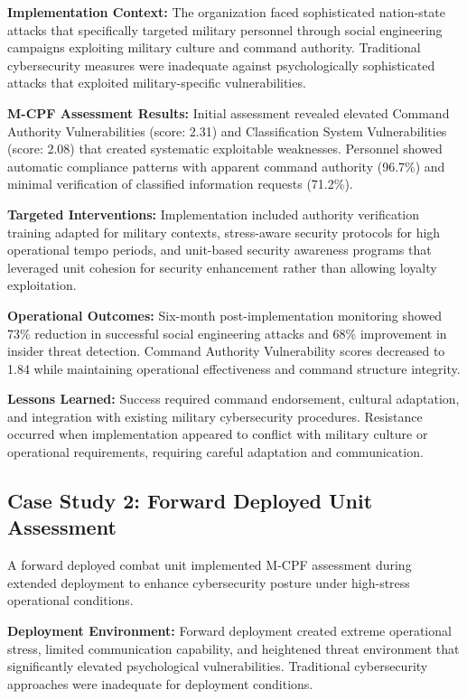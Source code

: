 \documentclass[10pt, twocolumn]{article}
\begin{document}
\textbf{Implementation Context:} The organization faced sophisticated nation-state attacks that specifically targeted military personnel through social engineering campaigns exploiting military culture and command authority. Traditional cybersecurity measures were inadequate against psychologically sophisticated attacks that exploited military-specific vulnerabilities.

\textbf{M-CPF Assessment Results:} Initial assessment revealed elevated Command Authority Vulnerabilities (score: 2.31) and Classification System Vulnerabilities (score: 2.08) that created systematic exploitable weaknesses. Personnel showed automatic compliance patterns with apparent command authority (96.7\%) and minimal verification of classified information requests (71.2\%).

\textbf{Targeted Interventions:} Implementation included authority verification training adapted for military contexts, stress-aware security protocols for high operational tempo periods, and unit-based security awareness programs that leveraged unit cohesion for security enhancement rather than allowing loyalty exploitation.

\textbf{Operational Outcomes:} Six-month post-implementation monitoring showed 73\% reduction in successful social engineering attacks and 68\% improvement in insider threat detection. Command Authority Vulnerability scores decreased to 1.84 while maintaining operational effectiveness and command structure integrity.

\textbf{Lessons Learned:} Success required command endorsement, cultural adaptation, and integration with existing military cybersecurity procedures. Resistance occurred when implementation appeared to conflict with military culture or operational requirements, requiring careful adaptation and communication.

\subsection{Case Study 2: Forward Deployed Unit Assessment}

A forward deployed combat unit implemented M-CPF assessment during extended deployment to enhance cybersecurity posture under high-stress operational conditions.

\textbf{Deployment Environment:} Forward deployment created extreme operational stress, limited communication capability, and heightened threat environment that significantly elevated psychological vulnerabilities. Traditional cybersecurity approaches were inadequate for deployment conditions.
\end{document}
